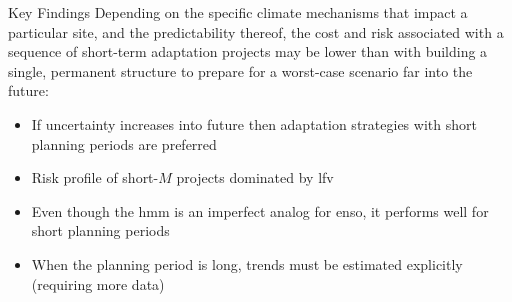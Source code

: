 {   
    \large
    \begin{block}{Key Findings}
        Depending on the specific climate mechanisms that impact a particular site, and the predictability thereof, the cost and risk associated with a sequence of short-term adaptation projects may be lower than with building a single, permanent structure to prepare for a worst-case scenario far into the future:
        \begin{itemize}
            \item If uncertainty increases into future then adaptation strategies with short planning periods are preferred
            \item Risk profile of short-$M$ projects dominated by \acrlong{lfv} \cite{Jain:2001hz, Hodgkins:2017hw}
            \item Even though the \gls{hmm} is an imperfect analog for \gls{enso}, it performs well for short planning periods
            \item When the planning period is long, trends must be estimated explicitly (requiring more data)
        \end{itemize}
    \end{block}
}